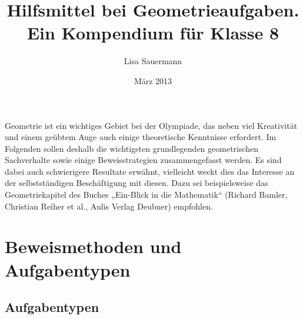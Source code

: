 \documentclass[11pt,a4paper]{article}
\title{Hilfsmittel bei Geometrieaufgaben.\\ Ein Kompendium für Klasse
  8\kosemnetlicensemark}
\author{Lisa Sauermann}
\date{März 2013}
\begin{document}
\maketitle

Geometrie ist ein wichtiges Gebiet bei der Olympiade, das neben viel
Kreativität und einem geübtem Auge auch einige theoretische Kenntnisse
erfordert. Im Folgenden sollen deshalb die wichtigsten grundlegenden
geometrischen Sachverhalte sowie einige Beweisstrategien zusammengefasst
werden. Es sind dabei auch schwierigere Resultate erwähnt, vielleicht weckt
dies das Interesse an der selbstständigen Beschäftigung mit diesen. Dazu sei
beispielsweise das Geometriekapitel des Buches „Ein-Blick in die Mathematik“
(Richard Bamler, Christian Reiher et al., Aulis Verlag Deubner) empfohlen.

\section{Beweismethoden und Aufgabentypen}

\subsection{Aufgabentypen}
\end{document}
